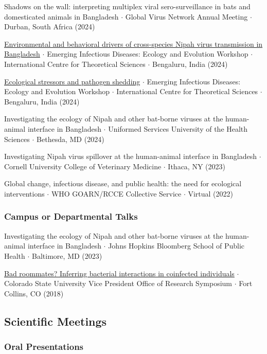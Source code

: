 \documentclass{cv}
\begin{document}
Shadows on the wall: interpreting multiplex viral sero-surveillance in bats and domesticated animals in Bangladesh $\cdot$ Global Virus Network Annual Meeting $\cdot$ Durban, South Africa (2024)

\href{https://www.youtube.com/live/MOgTl1EUSes?si=iMqpRzL8OlzRsdlE}{Environmental and behavioral drivers of cross-species Nipah virus transmission in Bangladesh} $\cdot$ 
Emerging Infectious Diseases: Ecology and Evolution Workshop $\cdot$ International Centre for Theoretical Sciences $\cdot$ Bengaluru, India (2024)

\href{https://www.youtube.com/live/WlhZYbyfGiw?si=1AW1gtXbbL0bbaPp}{Ecological stressors and pathogen shedding} $\cdot$ Emerging Infectious Diseases: Ecology and Evolution Workshop $\cdot$ International Centre for Theoretical Sciences $\cdot$ Bengaluru, India (2024)

Investigating the ecology of Nipah and other bat-borne viruses at the human-animal interface in Bangladesh $\cdot$ Uniformed Services University of the Health Sciences $\cdot$ Bethesda, MD (2024)

Investigating Nipah virus spillover at the human-animal interface in Bangladesh $\cdot$ Cornell University College of Veterinary Medicine $\cdot$ Ithaca, NY (2023)

Global change, infectious disease, and public health: the need for ecological interventions $\cdot$ WHO GOARN/RCCE Collective Service $\cdot$ Virtual (2022)

\subsubsection*{Campus or Departmental Talks}

Investigating the ecology of Nipah and other bat-borne viruses at the human-animal interface in Bangladesh $\cdot$ Johns Hopkins Bloomberg School of Public Health $\cdot$ Baltimore, MD (2023)

\href{https://www.youtube.com/watch?v=lYWR_dZRdjE}{Bad roommates? Inferring bacterial interactions in coinfected individuals} $\cdot$ Colorado State University Vice President Office of Research Symposium $\cdot$ Fort Collins, CO (2018)

\subsection*{Scientific Meetings}

\subsubsection*{Oral Presentations}
\end{document}
